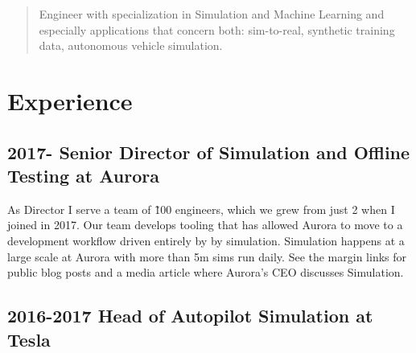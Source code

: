 \maketitle
{}


\begin{abstract}
Engineer with specialization in Simulation and Machine Learning and especially applications that concern both: sim-to-real, synthetic training data, autonomous vehicle simulation.
\end{abstract}

\section{Experience}

\subsection{2017- Senior Director of Simulation and Offline Testing at Aurora}


As Director I serve a team of \~100 engineers, which we grew from just 2 when I joined in 2017. Our team develops tooling that has allowed Aurora to move to a development workflow driven entirely by by simulation. Simulation happens at a large scale at Aurora with more than 5m sims run daily. See the margin links for public blog posts and a media article where Aurora's CEO discusses Simulation.

\subsection{2016-2017 Head of Autopilot Simulation at Tesla}


